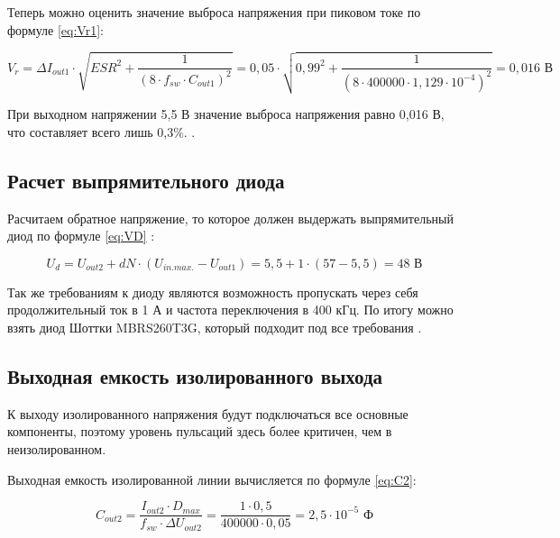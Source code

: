 Теперь можно оценить значение выброса напряжения при пиковом токе по формуле \ref{eq:Vr1}:

\begin{equation}
    V_{r} = \Delta I_{out1} \cdot \sqrt{ESR^{2} + \frac{1}{(8 \cdot f_{sw} \cdot C_{out1})^{2}}} =
    0,05 \cdot \sqrt{0,99^{2} + \frac{1}{(8 \cdot 400000 \cdot 1,129 \cdot 10^{-4})^{2}}} =
    0,016 \text{ В}
    \label{eq:Vr1}
\end{equation}

При выходном напряжении 5,5 В значение выброса напряжения равно 0,016 В, что составляет всего лишь 0,3\%. 
\cite{LMR36520:Aplication Note}.

\subsection{Расчет выпрямительного диода}
\hspace{1cm} 

Расчитаем обратное напряжение, то которое должен выдержать выпрямительный диод по формуле \ref{eq:VD} 
\cite{LMR36520:Aplication Note}:

\begin{equation}
    U_{d} = U_{out2} + dN \cdot (U_{in. max.} - U_{out1}) =
     5,5 + 1 \cdot (57 - 5,5) = 48 \text{ В}
    \label{eq:VD}
\end{equation}

Так же требованиям к диоду являются возможность пропускать через себя продолжительный ток в 1 А и частота
переключения в 400 кГц. По итогу можно взять диод Шоттки MBRS260T3G, который подходит под все требования 
\cite{MBRS260T3G:datasheet}.

\subsection{Выходная емкость изолированного выхода}
\hspace{1cm}

К выходу изолированного напряжения будут подключаться все основные компоненты, поэтому уровень пульсаций 
здесь более критичен, чем в неизолированном. 

Выходная емкость изолированной линии вычисляется по формуле \ref{eq:C2}:

\begin{equation}
    C_{out2} = \frac{I_{out2} \cdot D_{max}}{f_{sw} \cdot \Delta U_{out2}} =
    \frac{1 \cdot 0,5}{400000 \cdot 0,05} =
    2,5 \cdot 10^{-5} \text{ Ф}
    \label{eq:C2}
\end{equation}

